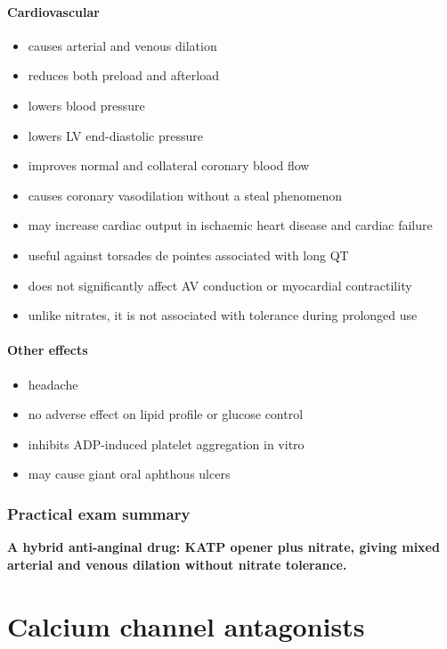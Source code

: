 \documentclass[11pt,a4paper]{article}
\begin{document}
\paragraph{Cardiovascular}
\begin{itemize}
    \item causes arterial and venous dilation
    \item reduces both preload and afterload
    \item lowers blood pressure
    \item lowers LV end-diastolic pressure
    \item improves normal and collateral coronary blood flow
    \item causes coronary vasodilation without a steal phenomenon
    \item may increase cardiac output in ischaemic heart disease and cardiac failure
    \item useful against torsades de pointes associated with long QT
    \item does not significantly affect AV conduction or myocardial contractility
    \item unlike nitrates, it is not associated with tolerance during prolonged use
\end{itemize}

\paragraph{Other effects}
\begin{itemize}
    \item headache
    \item no adverse effect on lipid profile or glucose control
    \item inhibits ADP-induced platelet aggregation in vitro
    \item may cause giant oral aphthous ulcers
\end{itemize}

\subsubsection*{Practical exam summary}

\textbf{A hybrid anti-anginal drug: KATP opener plus nitrate, giving mixed arterial and venous dilation without nitrate tolerance.}

\section{Calcium channel antagonists}
\end{document}

